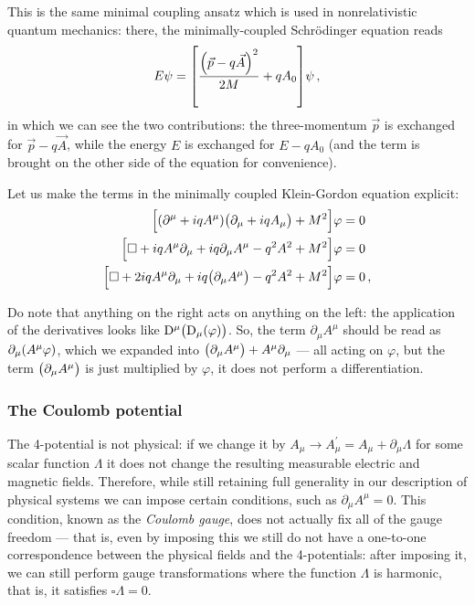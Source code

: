 \documentclass[main.tex]{subfiles}
\begin{document}
This is the same minimal coupling ansatz which is used in nonrelativistic quantum mechanics: there, the minimally-coupled Schrödinger equation reads 
%
\begin{align}
E \psi = \qty[\frac{\qty(\vec{p} - q \vec{A})^2}{2M}  + q A_0 ] \psi 
\,,
\end{align}
%
in which we can see the two contributions: the three-momentum \(\vec{p}\) is exchanged for \(\vec{p} - q \vec{A}\), while the energy \(E\) is exchanged for \(E - q A_0 \) (and the term is brought on the other side of the equation for convenience). 

Let us make the terms in the minimally coupled Klein-Gordon equation explicit: 
%
\begin{subequations}
\begin{align}
\qty[\qty(\partial^{\mu } +iqA^{\mu }) \qty(\partial_{\mu } +i q A_{\mu }) + M^2] \varphi &= 0  \\
\qty[\square + iq A^{\mu } \partial_{\mu } + iq \partial_{\mu } A^{\mu } - q^2A^2 + M^2] \varphi &=0  \\
\qty[\square + 2iq A^{\mu } \partial_{\mu } + iq \qty(\partial_{\mu } A^{\mu }) - q^2A^2 + M^2] \varphi &=0  
\,,
\end{align}
\end{subequations}
%

Do note that anything on the right acts on anything on the left: the application of the derivatives looks like \(
\mathrm{D}^{\mu } \qty(\mathrm{D}_{\mu } \qty(\varphi ))\). So, the term 
\(\partial_{\mu } A^{\mu }\) should be read as \(\partial_{\mu } \qty(A^{\mu } \varphi )\), which we expanded into \(\qty(\partial_{\mu } A^{\mu }) + A^{\mu } \partial_{\mu }\) --- all acting on \(\varphi \), but the term \(\qty(\partial_{\mu }A^{\mu })\) is just multiplied by \(\varphi \), it does not perform a differentiation.

\subsubsection{The Coulomb potential}

The 4-potential is not physical: if we change it by \(A_{\mu } \rightarrow A^{\prime }_{\mu } = A_{\mu } + \partial_{\mu } \Lambda \) for some scalar function \(\Lambda \) it does not change the resulting measurable electric and magnetic fields. 
Therefore, while still retaining full generality in our description of physical systems we can impose certain conditions, such as \(\partial_{\mu } A^{\mu } = 0\). 
This condition, known as the \emph{Coulomb gauge}, does not actually fix all of the gauge freedom --- that is, even by imposing this we still do not have a one-to-one correspondence between the physical fields and the 4-potentials: after imposing it, we can still perform gauge transformations where the function \(\Lambda \) is harmonic, that is, it satisfies \(\square \Lambda = 0\). 
\end{document}
